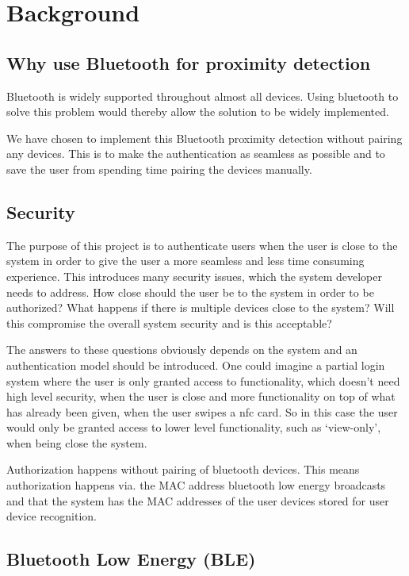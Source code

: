 \section{Background}

\subsection{Why use Bluetooth for proximity detection}

Bluetooth is widely supported throughout almost all devices.
Using bluetooth to solve this problem would thereby allow the solution to be widely implemented.

We have chosen to implement this Bluetooth proximity detection without pairing any devices.
This is to make the authentication as seamless as possible and to save the user from spending time pairing the devices manually.

\subsection{Security}

The purpose of this project is to authenticate users when the user is close to the system in order to give the user a more seamless and less time consuming experience.
This introduces many security issues, which the system developer needs to address.
How close should the user be to the system in order to be authorized? What happens if there is multiple devices close to the system? Will this compromise the overall system security and is this acceptable?

The answers to these questions obviously depends on the system and an authentication model should be introduced.
One could imagine a partial login system where the user is only granted access to functionality, which doesn’t need high level security, when the user is close and more functionality on top of what has already been given, when the user swipes a nfc card.
So in this case the user would only be granted access to lower level functionality, such as ‘view-only’, when being close the system.

Authorization happens without pairing of bluetooth devices.
This means authorization happens via.
the MAC address bluetooth low energy broadcasts and that the system has the MAC addresses of the user devices stored for user device recognition.

\subsection{Bluetooth Low Energy (BLE)}

